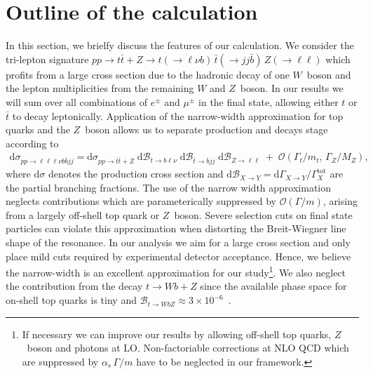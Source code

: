 \documentclass[preprint]{JHEP3}
\newcommand{\mrm}{\mathrm}
\newcommand{\rd}{\mathrm{d}}
\newcommand{\Br}{\mathcal{B}}
\def\ttb{t\bar{t}}
\newcommand{\be}{\begin{eqnarray}}
\newcommand{\ee}{\end{eqnarray}}
\begin{document}
\section{Outline of the calculation}
In this section, we brielfy discuss the features of our calculation.
We consider the tri-lepton signature  
$pp \to \ttb + Z \to t(\to \ell \nu b) \, \bar{t} (\to jj \bar{b}) \, Z(\to \ell \ell)$
which profits from a large cross section due to the hadronic decay of one $W$~boson and the lepton multiplicities from the remaining $W$ and $Z$~boson.
In our results we will sum over all combinations of $e^\pm$ and $\mu^\pm$ in the final state, allowing either $t$ or $\bar t$ to decay leptonically.
Application of the narrow-width approximation for top quarks and the $Z$~boson allows us to separate production and decays stage according to 
\be
 \rd \sigma_{pp\to\ell\ell\ell\nu b \bar{b} jj} = \rd \sigma_{pp\to\ttb+Z} \; \rd\Br_{t\to b \ell\nu} \; \rd\Br_{\bar{t} \to \bar{b} jj} \; \rd\Br_{Z\to \ell\ell}
 \;+\; \mathcal{O}(\Gamma_t/m_t, \, \Gamma_Z/M_Z)
, \label{Xsec}
\ee
where $\rd \sigma$ denotes the production cross section and $\rd\Br_{X\to Y}= \rd \Gamma_{X\to Y} \big/ \Gamma^\mrm{tot}_X$ are the partial branching fractions.
The use of the narrow width approximation neglects contributions which are parameterically suppressed by $\mathcal{O}(\Gamma / m)$, arising from a largely off-shell top quark or $Z$~boson.
Severe selection cuts on final state particles can violate this approximation when distorting the Breit-Wiegner line shape of the resonance.
In our analysis we aim for a large cross section and only place mild cuts required by experimental detector acceptance. 
Hence, we believe the narrow-width is an excellent approximation for our study\footnote{
If necessary we can improve our results by allowing off-shell top quarks, $Z$~boson and photons at LO.
Non-factoriable corrections at NLO QCD which are suppressed by $\alpha_s \, \Gamma/m$ have to be neglected in our framework.
}.
We also neglect the contribution from the decay $t \to Wb+Z$ since the available phase space for on-shell top quarks is tiny and 
$\Br_{t\to W bZ } \approx 3 \times 10^{-6}$~\cite{Altarelli:2000nt,Decker:1992wz,Mahlon:1994us,Jenkins:1996zd}.
\end{document}
